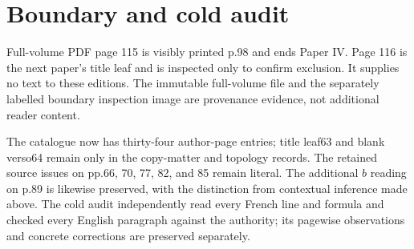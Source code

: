 \documentclass[11pt]{article}
\begin{document}
\section*{Boundary and cold audit}
Full-volume PDF page 115 is visibly printed p.98 and ends Paper IV. Page 116
is the next paper's title leaf and is inspected only to confirm exclusion.
It supplies no text to these editions. The immutable full-volume file and the
separately labelled boundary inspection image are provenance evidence, not
additional reader content.

The catalogue now has thirty-four author-page entries; title leaf63 and blank
verso64 remain only in the copy-matter and topology records. The retained source
issues on pp.66, 70, 77, 82, and 85 remain literal. The additional $b$ reading
on p.89 is likewise preserved, with the distinction from contextual inference
made above. The cold audit independently read every French line and formula
and checked every English paragraph against the authority; its pagewise
observations and concrete corrections are preserved separately.
\end{document}
